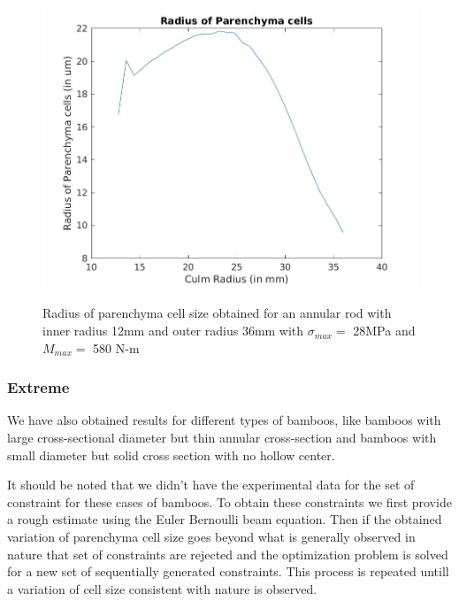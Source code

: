 \documentclass[10pt]{article}
\begin{document}
\begin{figure}[H]
\begin{center}
	\includegraphics[scale=0.3]{./Plots/normal/b77.jpg}
	\label{fig:cellsize}
	\caption{Radius of parenchyma cell size obtained for an annular rod with inner radius 12mm and outer radius 36mm with $\sigma_{max} = $ 28MPa and $M_{max} = $ 580 N-m}
\end{center}
\end{figure}

\subsubsection{Extreme}
We have also obtained results for different types of bamboos, like bamboos with large cross-sectional diameter but thin annular cross-section and bamboos with small diameter but solid cross section with no hollow center.\par
It should be noted that we didn't have the experimental data for the set of constraint for these cases of bamboos. To obtain these constraints we first provide a rough estimate using the Euler Bernoulli beam equation. Then if the obtained variation of parenchyma cell size goes beyond what is generally observed in nature that set of constraints are rejected and the optimization problem is solved for a new set of sequentially generated constraints. This process is repeated untill a variation of cell size consistent with nature is observed. 
\end{document}
